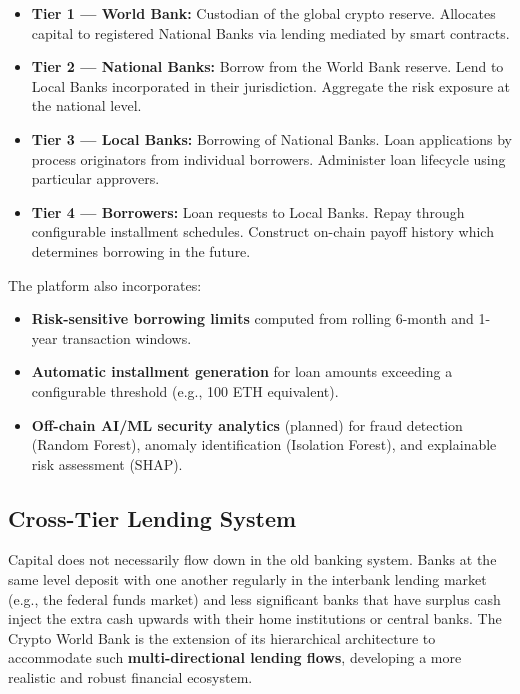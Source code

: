 \documentclass[12pt,a4paper]{report}
\begin{document}
\begin{itemize}[noitemsep]
\item \textbf{Tier 1 --- World Bank:} Custodian of the global crypto reserve. Allocates capital to registered National Banks via lending mediated by smart contracts.
\item \textbf{Tier 2 --- National Banks:} Borrow from the World Bank reserve. Lend to Local Banks incorporated in their jurisdiction. Aggregate the risk exposure at the national level.
\item \textbf{Tier 3 --- Local Banks:} Borrowing of National Banks. Loan applications by process originators from individual borrowers. Administer loan lifecycle using particular approvers.
\item \textbf{Tier 4 --- Borrowers:} Loan requests to Local Banks. Repay through configurable installment schedules. Construct on-chain payoff history which determines borrowing in the future.
\end{itemize}

The platform also incorporates:

\begin{itemize}[noitemsep]
\item \textbf{Risk-sensitive borrowing limits} computed from rolling 6-month and 1-year transaction windows.
\item \textbf{Automatic installment generation} for loan amounts exceeding a configurable threshold (e.g., 100 ETH equivalent).
\item \textbf{Off-chain AI/ML security analytics} (planned) for fraud detection (Random Forest), anomaly identification (Isolation Forest), and explainable risk assessment (SHAP).
\end{itemize}

\subsection{Cross-Tier Lending System}

Capital does not necessarily flow down in the old banking system. Banks at the same level deposit with one another regularly in the interbank lending market (e.g., the federal funds market) and less significant banks that have surplus cash inject the extra cash upwards with their home institutions or central banks. The Crypto World Bank is the extension of its hierarchical architecture to accommodate such \textbf{multi-directional lending flows}, developing a more realistic and robust financial ecosystem.
\end{document}
